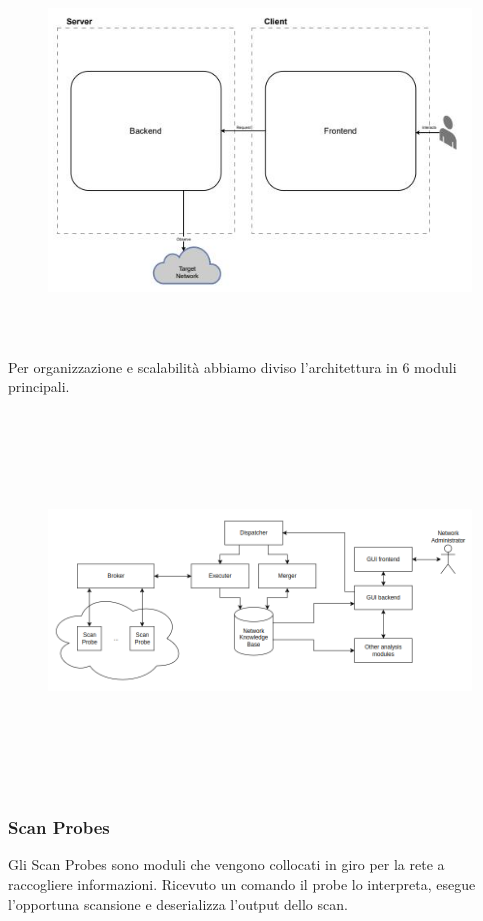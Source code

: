 \documentclass[target=bach,aauheader=,style=]{thud}
\begin{document}
\begin{figure}[h]
  \includegraphics[width=15cm, height=10cm]{client_server}
  \centering
\end{figure}

\FloatBarrier

Per organizzazione e scalabilità abbiamo diviso l'architettura in 6 moduli principali.


\begin{figure}[h]
  \includegraphics[width=15cm, height=10cm]{moduli_new}
  \centering
\end{figure}

\FloatBarrier

\subsubsection{Scan Probes}
Gli Scan Probes sono moduli che vengono collocati in giro per la rete a raccogliere informazioni. 
Ricevuto un comando il probe lo interpreta, esegue l'opportuna scansione e deserializza l'output dello scan.
\end{document}

